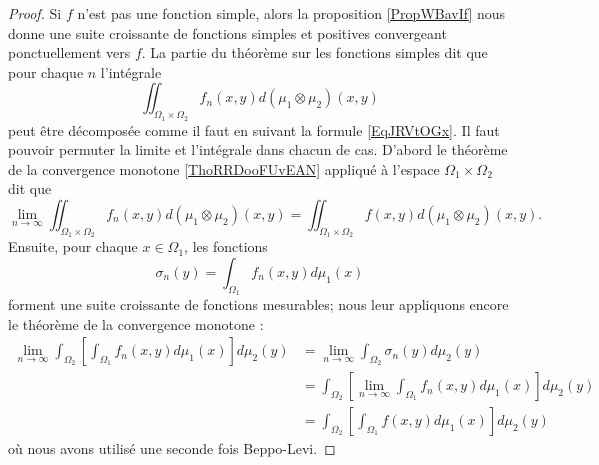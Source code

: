 \begin{proof}
    Si \( f\) n'est pas une fonction simple, alors la proposition \ref{PropWBavIf} nous donne une suite croissante de fonctions simples et positives convergeant ponctuellement vers \( f\). La partie du théorème sur les fonctions simples dit que pour chaque \( n\) l'intégrale
    \begin{equation}
        \iint_{\Omega_1\times \Omega_2}f_n(x,y)d(\mu_1\otimes\mu_2)(x,y)
    \end{equation}
    peut être décomposée comme il faut en suivant la formule \eqref{EqJRVtOGx}. Il faut pouvoir permuter la limite et l'intégrale dans chacun de cas. D'abord le théorème de la convergence monotone \ref{ThoRRDooFUvEAN} appliqué à l'espace \( \Omega_1\times \Omega_2\) dit que
    \begin{equation}
        \lim_{n\to \infty} \iint_{\Omega_1\times \Omega_2}f_n(x,y)d(\mu_1\otimes \mu_2)(x,y)= \iint_{\Omega_1\times \Omega_2}f(x,y)d(\mu_1\otimes \mu_2)(x,y).
    \end{equation}
    Ensuite, pour chaque \( x\in\Omega_1\), les fonctions
    \begin{equation}
        \sigma_n(y)=\int_{\Omega_1}f_n(x,y)d\mu_1(x)
    \end{equation}
    forment une suite croissante de fonctions mesurables; nous leur appliquons encore le théorème de la convergence monotone :
    \begin{subequations}
        \begin{align}
            \lim_{n\to \infty} \int_{\Omega_2}\left[ \int_{\Omega_1}f_n(x,y)d\mu_1(x) \right]d\mu_2(y)&=\lim_{n\to \infty} \int_{\Omega_2}\sigma_n(y)d\mu_2(y)\\
            &=\int_{\Omega_2}\left[\lim_{n\to \infty} \int_{\Omega_1}f_n(x,y)d\mu_1(x)\right]d\mu_2(y)\\
            &=\int_{\Omega_2}\left[ \int_{\Omega_1}f(x,y)d\mu_1(x) \right]d\mu_2(y)
        \end{align}
    \end{subequations}
    où nous avons utilisé une seconde fois Beppo-Levi.
\end{proof}

